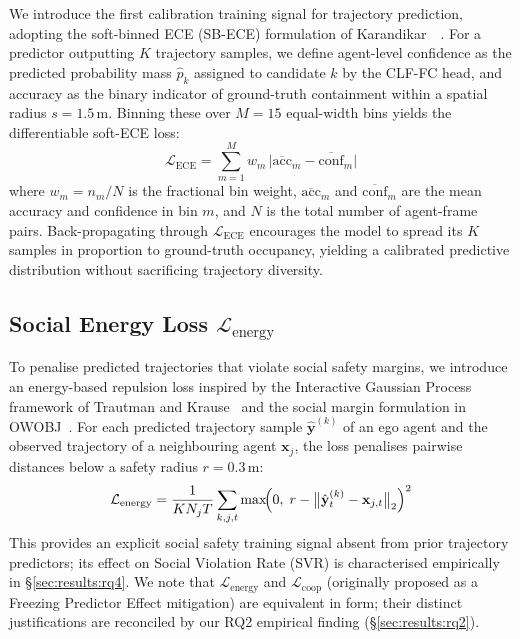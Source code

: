 We introduce the first calibration training signal for trajectory prediction,
adopting the soft-binned ECE (SB-ECE) formulation of
Karandikar~\etal~\cite{karandikar2021soft}. For a predictor outputting \(K\)
trajectory samples, we define agent-level confidence as the predicted
probability mass \(\hat{p}_k\) assigned to candidate \(k\) by the CLF-FC
head, and accuracy as the binary indicator of ground-truth containment within
a spatial radius \(s = 1.5\)\,m. Binning these over \(M = 15\) equal-width
bins yields the differentiable soft-ECE loss:
%
\begin{equation}
  \mathcal{L}_{\text{ECE}} = \sum_{m=1}^{M} w_m \,
  \bigl| \overline{\text{acc}}_m - \overline{\text{conf}}_m \bigr|
  \label{eq:lece}
\end{equation}
%
where \(w_m = n_m / N\) is the fractional bin weight,
\(\overline{\text{acc}}_m\) and \(\overline{\text{conf}}_m\) are the mean
accuracy and confidence in bin \(m\), and \(N\) is the total number of
agent-frame pairs. Back-propagating through \(\mathcal{L}_{\text{ECE}}\)
encourages the model to spread its \(K\) samples in proportion to
ground-truth occupancy, yielding a calibrated predictive distribution without
sacrificing trajectory diversity.

\subsection{Social Energy Loss \(\mathcal{L}_{\text{energy}}\)}
\label{sec:method:energy}

To penalise predicted trajectories that violate social safety margins, we
introduce an energy-based repulsion loss inspired by the Interactive Gaussian
Process framework of Trautman and Krause~\cite{trautman2010unfreezing} and the
social margin formulation in OWOBJ~\cite{zhang2025openworld}. For each
predicted trajectory sample \(\hat{\mathbf{y}}^{(k)}\) of an ego agent and
the observed trajectory of a neighbouring agent \(\mathbf{x}_j\), the loss
penalises pairwise distances below a safety radius \(r = 0.3\)\,m:
%
\begin{equation}
  \mathcal{L}_{\text{energy}} = \frac{1}{KN_j T}
  \sum_{k,j,t} \max\!\Bigl(0,\;
  r - \bigl\|\hat{\mathbf{y}}^{(k)}_t - \mathbf{x}_{j,t}\bigr\|_2\Bigr)^2
  \label{eq:lenergy}
\end{equation}
%
This provides an explicit social safety training signal absent from prior
trajectory predictors; its effect on Social Violation Rate (SVR) is
characterised empirically in \S\ref{sec:results:rq4}.
We note that \(\mathcal{L}_{\text{energy}}\) and \(\mathcal{L}_{\text{coop}}\)
(originally proposed as a Freezing Predictor Effect mitigation) are equivalent
in form; their distinct justifications are reconciled by our RQ2 empirical
finding (\S\ref{sec:results:rq2}).

